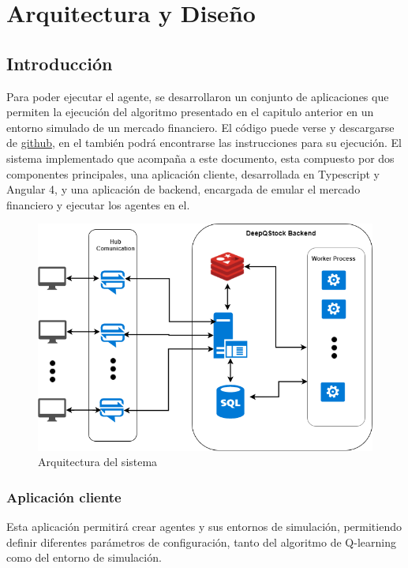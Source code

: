 \chapter{Arquitectura y Diseño}


\section{Introducción}

Para poder ejecutar el agente, se desarrollaron un conjunto de aplicaciones que permiten la ejecución del algoritmo presentado en el capitulo anterior en un entorno simulado de un mercado financiero.
El código puede verse y descargarse de \href{https://github.com/jcaramello/deepQ-stock}{github}, en el también podrá encontrarse las instrucciones para su ejecución. El sistema implementado que acompaña a este documento, esta compuesto por dos componentes principales, una aplicación cliente, desarrollada en Typescript y Angular 4, y una aplicación de backend, 
encargada de emular el mercado financiero y ejecutar los agentes en el.

\begin{figure}[h!]
	\includegraphics[scale=0.5]{imagenes/deepQStockArchitectureOverview.png}
	\caption{Arquitectura del sistema}
\end{figure}

\subsection{Aplicación cliente}
Esta aplicación permitirá crear agentes y sus entornos de simulación, permitiendo definir diferentes parámetros de configuración, tanto del algoritmo de Q-learning como del entorno de simulación.\\

